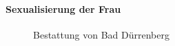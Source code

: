 \documentclass[
  letterpaper,
  DIV=11,
  numbers=noendperiod]{scrartcl}
\let\oldparagraph\paragraph
\renewcommand{\paragraph}[1]{\oldparagraph{#1}\mbox{}}
\begin{document}
\paragraph{Sexualisierung der Frau}\label{sec-sexualisierung-der-frau}

\begin{figure}


\caption{\label{fig-bestattung-von-bad-duerrenberg}Bestattung von Bad
Dürrenberg}

\end{figure}%
\end{document}

